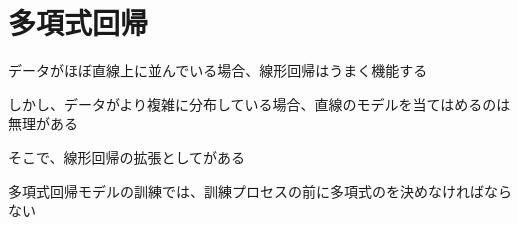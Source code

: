 \documentclass[../../../topic_machine-learning]{subfiles}
\begin{document}
\sectionline
\section{多項式回帰}

データがほぼ直線上に並んでいる場合、線形回帰はうまく機能する

しかし、データがより複雑に分布している場合、直線のモデルを当てはめるのは無理がある

\br

そこで、線形回帰の拡張としてがある

\br


\br

多項式回帰モデルの訓練では、訓練プロセスの前に多項式のを決めなければならない
\end{document}
